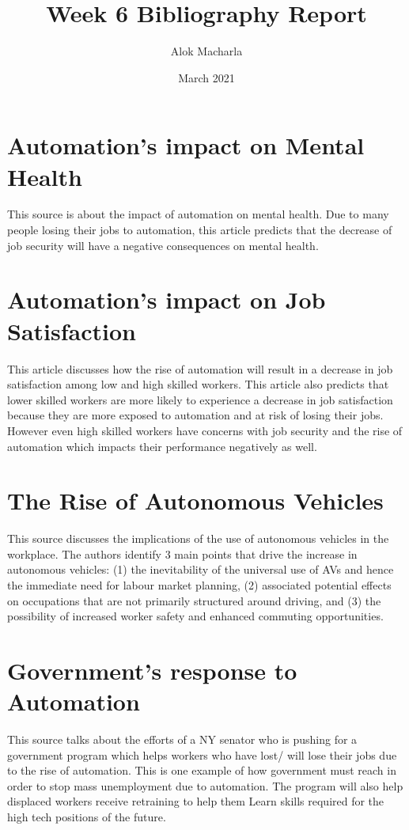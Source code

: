 \documentclass{article}
\title{Week 6 Bibliography Report}
\author{Alok Macharla}
\date{March 2021}
\begin{document}
\maketitle

\section{Automation's impact on Mental Health}
This source is about the impact of automation on mental health. Due to many people losing their jobs to automation, this article predicts that the decrease of job security will have a negative consequences on mental health. \cite{PATEL201854}

\section{Automation's impact on Job Satisfaction}
This article discusses how the rise of automation will result in a decrease in job satisfaction among low and high skilled workers. This article also predicts that lower skilled workers are more likely to experience a decrease in job satisfaction because they are more exposed to automation and at risk of losing their jobs. However even high skilled workers have concerns with job security and the rise of automation which impacts their performance negatively as well. \cite{3325322720201130}

\section{The Rise of Autonomous Vehicles}
This source discusses the implications of the use of autonomous vehicles in the workplace.
The authors identify 3 main points that drive the increase in autonomous vehicles:
(1) the inevitability of the universal use of AVs and hence the immediate need for labour market planning, (2) associated potential effects on occupations that are not primarily structured around driving, and (3) the possibility of increased worker safety and enhanced commuting opportunities.\cite{3020020620180830}

\section{Government's response to Automation}
This source talks about the efforts of a NY senator who is pushing for a government program which helps workers who have lost/ will lose their jobs due to the rise of automation. This is one example of how government must reach in order to stop mass unemployment due to automation. The program will also help displaced workers receive retraining to help them Learn skills required for the high tech positions of the future. \cite{edsgit.A54253820120180613}
\end{document}
